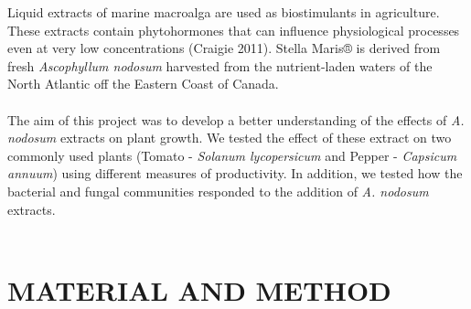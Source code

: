 \documentclass[11pt,]{article}
\begin{document}
Liquid extracts of marine macroalga are used as biostimulants in
agriculture. These extracts contain phytohormones that can influence
physiological processes even at very low concentrations (Craigie 2011).
Stella Maris® is derived from fresh \emph{Ascophyllum nodosum} harvested
from the nutrient-laden waters of the North Atlantic off the Eastern
Coast of Canada.\\
\hspace*{0.333em}\\
The aim of this project was to develop a better understanding of the
effects of \emph{A. nodosum} extracts on plant growth. We tested the
effect of these extract on two commonly used plants (Tomato -
\emph{Solanum lycopersicum} and Pepper - \emph{Capsicum annuum}) using
different measures of productivity. In addition, we tested how the
bacterial and fungal communities responded to the addition of \emph{A.
nodosum} extracts.\\
\hspace*{0.333em} ~

\section{MATERIAL AND METHOD}\label{material-and-method}
\end{document}
